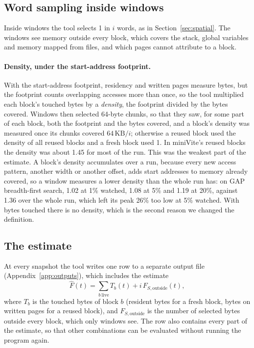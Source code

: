\documentclass[11pt]{article}
\newcommand{\secref}[1]{Section~\ref{#1}}
\newcommand{\term}[1]{\emph{#1}}
\begin{document}
\subsection{Word sampling inside windows}
\label{sec:density}

Inside windows the tool selects 1 in $i$ words, as in \secref{sec:spatial}. The windows see memory outside every block, which covers the stack, global variables and memory mapped from files, and which pages cannot attribute to a block.

\paragraph{Density, under the start-address footprint.}
With the start-address footprint, residency and written pages measure bytes, but the footprint counts overlapping accesses more than once, so the tool multiplied each block's touched bytes by a \term{density}, the footprint divided by the bytes covered. Windows then selected 64-byte chunks, so that they saw, for some part of each block, both the footprint and the bytes covered, and a block's density was measured once its chunks covered $64\,\text{KB}/i$; otherwise a reused block used the density of all reused blocks and a fresh block used 1. In miniVite's reused blocks the density was about 1.45 for most of the run. This was the weakest part of the estimate. A block's density accumulates over a run, because every new access pattern, another width or another offset, adds start addresses to memory already covered, so a window measures a lower density than the whole run has: on GAP breadth-first search, 1.02 at 1\% watched, 1.08 at 5\% and 1.19 at 20\%, against 1.36 over the whole run, which left its peak 26\% too low at 5\% watched. With bytes touched there is no density, which is the second reason we changed the definition.

\subsection{The estimate}
\label{sec:estimate}

At every snapshot the tool writes one row to a separate output file (Appendix~\ref{app:outputs}), which includes the estimate
\begin{equation}
\hat{F}(t) = \sum_{b\ \text{live}} T_b(t) + i\,F_{S,\text{outside}}(t),
\label{eq:windowed}
\end{equation}
where $T_b$ is the touched bytes of block $b$ (resident bytes for a fresh block, bytes on written pages for a reused block), and $F_{S,\text{outside}}$ is the number of selected bytes outside every block, which only windows see. The row also contains every part of the estimate, so that other combinations can be evaluated without running the program again.
\end{document}
